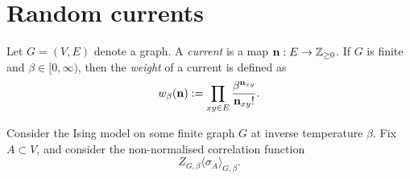 \section{Random currents}

\begin{definition}[Currents]
    Let $G=(V,E)$ denote a graph.
    A \emph{current} is a map $\mathbf{n}:E\to\mathbb Z_{\geq 0}$.
    If $G$ is finite and $\beta\in[0,\infty)$, then the
    \emph{weight} of a current is defined as
    \[
        w_\beta(\mathbf{n}):=\prod_{xy\in E}
        \frac{\beta^{\mathbf{n}_{xy}}}{\mathbf{n}_{xy}!}.
    \]
\end{definition}

Consider the Ising model on some finite graph $G$ at inverse temperature $\beta$.
Fix $A\subset V$, and consider the non-normalised correlation function
\[
    Z_{G,\beta}\langle\sigma_A\rangle_{G,\beta}.
\]

